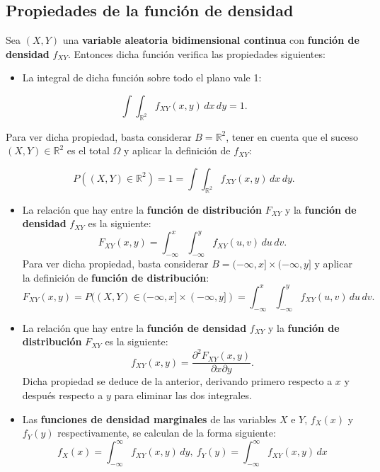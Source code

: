 \documentclass[]{book}
\providecommand{\tightlist}{%
  \setlength{\itemsep}{0pt}\setlength{\parskip}{0pt}}
\begin{document}
\hypertarget{propiedades-de-la-funciuxf3n-de-densidad}{%
\subsection{Propiedades de la función de densidad}\label{propiedades-de-la-funciuxf3n-de-densidad}}

Sea \((X,Y)\) una \textbf{variable aleatoria bidimensional continua} con \textbf{función de densidad} \(f_{XY}\). Entonces dicha función verifica las propiedades siguientes:

\begin{itemize}
\tightlist
\item
  La integral de dicha función sobre todo el plano vale 1:
\end{itemize}

\[
\int\int_{\mathbb{R}^2} f_{XY}(x,y)\,dx\,dy =1.
\]

Para ver dicha propiedad, basta considerar \(B=\mathbb{R}^2\), tener en cuenta que el suceso \((X,Y)\in \mathbb{R}^2\) es el total \(\Omega\) y aplicar la definición de \(f_{XY}\):

\[
P((X,Y)\in \mathbb{R}^2)=1= \int\int_{\mathbb{R}^2} f_{XY}(x,y)\,dx\,dy.
\]

\begin{itemize}
\item
  La relación que hay entre la \textbf{función de distribución} \(F_{XY}\) y la \textbf{función de densidad} \(f_{XY}\) es la siguiente:
  \[
  F_{XY}(x,y)=\int_{-\infty}^x\int_{-\infty}^y f_{XY}(u,v)\,du\,dv.
  \]
  Para ver dicha propiedad, basta considerar \(B=(-\infty,x]\times (-\infty,y]\) y aplicar la definición de \textbf{función de distribución}:
  \[
  F_{XY}(x,y)=P((X,Y)\in (-\infty,x]\times (-\infty,y])=\int_{-\infty}^x\int_{-\infty}^y f_{XY}(u,v)\,du\,dv.
  \]
\item
  La relación que hay entre la \textbf{función de densidad} \(f_{XY}\) y la \textbf{función de distribución} \(F_{XY}\) es la siguiente:
  \[
  f_{XY}(x,y)=\frac{\partial^2 F_{XY}(x,y)}{\partial x\partial y}.
  \]
  Dicha propiedad se deduce de la anterior, derivando primero respecto a \(x\) y después respecto a \(y\) para eliminar las dos integrales.
\item
  Las \textbf{funciones de densidad marginales} de las variables \(X\) e \(Y\), \(f_X(x)\) y \(f_Y(y)\) respectivamente, se calculan de la forma siguiente:
  \[
  f_X(x)=\int_{-\infty}^\infty f_{XY}(x,y)\, dy,\ f_Y(y)=\int_{-\infty}^\infty f_{XY}(x,y)\, dx
  \]
\end{itemize}
\end{document}
